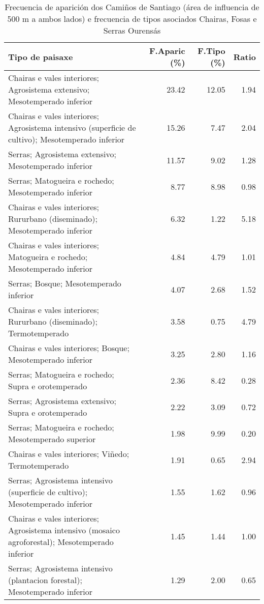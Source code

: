 \begin{table}[p]
\centering
\caption{Frecuencia de aparición dos Camiños de Santiago (área de influencia de 500 m a ambos lados) e frecuencia de tipos asociados Chairas, Fosas e Serras Ourensás} 
\label{vcamino8}
\begin{tabular}{lrrr}
  \hline
Tipo de paisaxe & F.Aparic (\%) & F.Tipo (\%) & Ratio \\ 
  \hline
Chairas e vales interiores; Agrosistema extensivo; Mesotemperado inferior & 23.42 & 12.05 & 1.94 \\ 
  Chairas e vales interiores; Agrosistema intensivo (superficie de cultivo); Mesotemperado inferior & 15.26 & 7.47 & 2.04 \\ 
  Serras; Agrosistema extensivo; Mesotemperado inferior & 11.57 & 9.02 & 1.28 \\ 
  Serras; Matogueira e rochedo; Mesotemperado inferior & 8.77 & 8.98 & 0.98 \\ 
  Chairas e vales interiores; Rururbano (diseminado); Mesotemperado inferior & 6.32 & 1.22 & 5.18 \\ 
  Chairas e vales interiores; Matogueira e rochedo; Mesotemperado inferior & 4.84 & 4.79 & 1.01 \\ 
  Serras; Bosque; Mesotemperado inferior & 4.07 & 2.68 & 1.52 \\ 
  Chairas e vales interiores; Rururbano (diseminado); Termotemperado & 3.58 & 0.75 & 4.79 \\ 
  Chairas e vales interiores; Bosque; Mesotemperado inferior & 3.25 & 2.80 & 1.16 \\ 
  Serras; Matogueira e rochedo; Supra e orotemperado & 2.36 & 8.42 & 0.28 \\ 
  Serras; Agrosistema extensivo; Supra e orotemperado & 2.22 & 3.09 & 0.72 \\ 
  Serras; Matogueira e rochedo; Mesotemperado superior & 1.98 & 9.99 & 0.20 \\ 
  Chairas e vales interiores; Viñedo; Termotemperado & 1.91 & 0.65 & 2.94 \\ 
  Serras; Agrosistema intensivo (superficie de cultivo); Mesotemperado inferior & 1.55 & 1.62 & 0.96 \\ 
  Chairas e vales interiores; Agrosistema intensivo (mosaico agroforestal); Mesotemperado inferior & 1.45 & 1.44 & 1.00 \\ 
  Serras; Agrosistema intensivo (plantacion forestal); Mesotemperado inferior & 1.29 & 2.00 & 0.65 \\ 
   \hline
\end{tabular}
\end{table}
